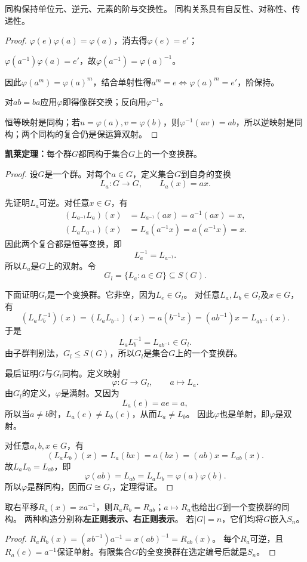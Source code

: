 \begin{proposition}
同构保持单位元、逆元、元素的阶与交换性。
同构关系具有自反性、对称性、传递性。
\end{proposition}
\begin{proof}
$\varphi(e)\varphi(a)=\varphi(a)$，消去得$\varphi(e)=e'$；

$\varphi(a^{-1})\varphi(a)=e'$，故$\varphi(a^{-1})=\varphi(a)^{-1}$。

因此$\varphi(a^m)=\varphi(a)^m$，结合单射性得$a^m=e\iff\varphi(a)^m=e'$，阶保持。

对$ab=ba$应用$\varphi$即得像群交换；反向用$\varphi^{-1}$。

恒等映射是同构；若$u=\varphi(a),v=\varphi(b)$，则$\varphi^{-1}(uv)=ab$，所以逆映射是同构；两个同构的复合仍是保运算双射。
\end{proof}
\begin{theorem}
\textbf{凯莱定理：}每个群$G$都同构于集合$G$上的一个变换群。
\end{theorem}
\begin{proof}
设$G$是一个群。对每个$a\in G$，定义集合$G$到自身的变换
\[
L_a:G\longrightarrow G,\qquad L_a(x)=ax.
\]

先证明$L_a$可逆。对任意$x\in G$，有
\[
\begin{aligned}
(L_{a^{-1}}L_a)(x)
&=L_{a^{-1}}(ax)
=a^{-1}(ax)
=x,\\
(L_aL_{a^{-1}})(x)
&=L_a(a^{-1}x)
=a(a^{-1}x)
=x.
\end{aligned}
\]
因此两个复合都是恒等变换，即
\[
L_a^{-1}=L_{a^{-1}}.
\]
所以$L_a$是$G$上的双射。令
\[
G_l=\{L_a:a\in G\}\subseteq S(G).
\]

下面证明$G_l$是一个变换群。它非空，因为$L_e\in G_l$。
对任意$L_a,L_b\in G_l$及$x\in G$，有
\[(L_aL_b^{-1})(x)
=(L_aL_{b^{-1}})(x)=a(b^{-1}x)=(ab^{-1})x=L_{ab^{-1}}(x).\]
于是
\[
L_aL_b^{-1}=L_{ab^{-1}}\in G_l.
\]
由子群判别法，$G_l\leq S(G)$，所以$G_l$是集合$G$上的一个变换群。

最后证明$G$与$G_l$同构。定义映射
\[
\varphi:G\longrightarrow G_l,\qquad a\longmapsto L_a.
\]
由$G_l$的定义，$\varphi$是满射。又因为
\[
L_a(e)=ae=a,
\]
所以当$a\neq b$时，$L_a(e)\neq L_b(e)$，从而$L_a\neq L_b$。
因此$\varphi$也是单射，即$\varphi$是双射。

对任意$a,b,x\in G$，有
\[(L_aL_b)(x)=L_a(bx)=a(bx)=(ab)x=L_{ab}(x).\]
故$L_aL_b=L_{ab}$，即
\[
\varphi(ab)=L_{ab}=L_aL_b=\varphi(a)\varphi(b).
\]
所以$\varphi$是群同构，因而$G\cong G_l$，定理得证。
\end{proof}

\begin{proposition}
\label{p2:concept:c1-l468}取右平移$R_a(x)=xa^{-1}$，则$R_aR_b=R_{ab}$；$a\mapsto R_a$也给出$G$到一个变换群的同构。
两种构造分别称\textbf{左正则表示、右正则表示}。
若$|G|=n$，它们均将$G$嵌入$S_n$。
\end{proposition}
\begin{proof}
$R_aR_b(x)=(xb^{-1})a^{-1}=x(ab)^{-1}=R_{ab}(x)$。
每个$R_a$可逆，且$R_a(e)=a^{-1}$保证单射。有限集合$G$的全变换群在选定编号后就是$S_n$。
\end{proof}


